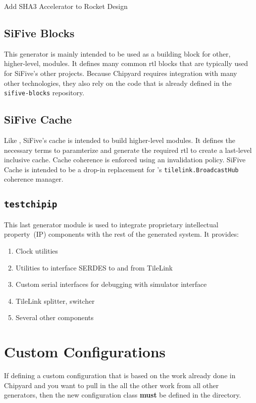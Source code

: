 \begin{listing}[h!tbp]
\caption{Add SHA3 Accelerator to Rocket Design}
\label{lst:SHA3_Accelerator_Addition}
\end{listing}

\subsection{SiFive Blocks}\label{sec:SiFive_Blocks}
\nocite{siFiveBlocksGithub}
This generator is mainly intended to be used as a building block for other, higher-level, modules.
It defines many common \gls{rtl} blocks that are typically used for SiFive's other projects.
Because Chipyard requires integration with many other technologies, they also rely on the code that is already defined in the \texttt{sifive-blocks} repository.

\subsection{SiFive Cache}\label{sec:SiFive_Cache}
\nocite{siFiveCacheGithub}
Like , SiFive's cache is intended to build higher-level modules.
It defines the necessary terms to paramterize and generate the required \gls{rtl} to create a last-level inclusive cache.
Cache coherence is enforced using an invalidation policy.
SiFive Cache is intended to be a drop-in replacement for 's \texttt{tilelink.BroadcastHub} coherence manager.

\subsection{\texttt{testchipip}}\label{sec:testchipip}
\nocite{testchipipGithub}
This last generator module is used to integrate proprietary intellectual property~(IP) components with the rest of the generated system.
It provides:
\begin{enumerate}
\item Clock utilities
\item Utilities to interface SERDES to and from TileLink
\item Custom serial interfaces for debugging with simulator interface
\item TileLink splitter, switcher
\item Several other components
\end{enumerate}

\section{Custom Configurations}\label{sec:Custom_Configurations}
If defining a custom configuration that is based on the work already done in Chipyard and you want to pull in the all the other work from all other generators, then the new configuration class \textbf{must} be defined in the  directory.

